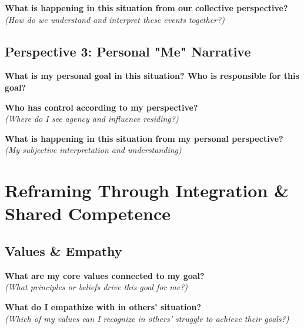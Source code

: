 \documentclass[11pt,a4paper]{article}
\begin{document}
\noindent\textbf{What is happening in this situation from our collective perspective?}\\
\textit{(How do we understand and interpret these events together?)}
\begin{answerbox}
\vspace{3em}
\end{answerbox}

\subsection{Perspective 3: Personal "Me" Narrative}

\noindent\textbf{What is my personal goal in this situation? Who is responsible for this goal?}
\begin{answerbox}
\vspace{3em}
\end{answerbox}

\noindent\textbf{Who has control according to my perspective?}\\
\textit{(Where do I see agency and influence residing?)}
\begin{answerbox}
\vspace{3em}
\end{answerbox}

\noindent\textbf{What is happening in this situation from my personal perspective?}\\
\textit{(My subjective interpretation and understanding)}
\begin{answerbox}
\vspace{3em}
\end{answerbox}

\section{Reframing Through Integration \& Shared Competence}

\subsection{Values \& Empathy}

\noindent\textbf{What are my core values connected to my goal?}\\
\textit{(What principles or beliefs drive this goal for me?)}
\begin{answerbox}
\vspace{3em}
\end{answerbox}

\noindent\textbf{What do I empathize with in others' situation?}\\
\textit{(Which of my values can I recognize in others' struggle to achieve their goals?)}
\begin{answerbox}
\vspace{3em}
\end{answerbox}
\end{document}
